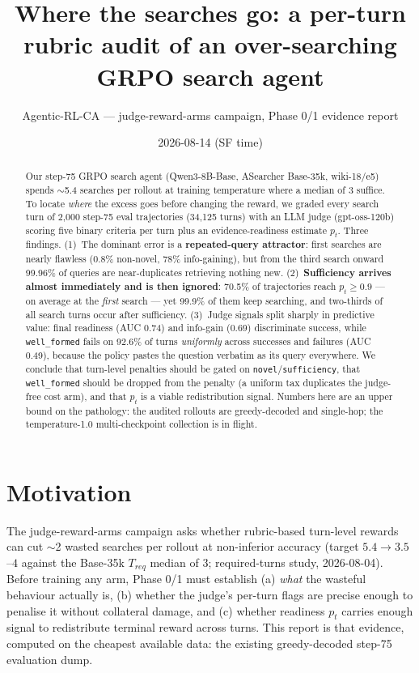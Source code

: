 \documentclass[10pt]{article}
\title{\vspace{-1.5em}Where the searches go: a per-turn rubric audit of an over-searching GRPO search agent\vspace{-0.4em}}
\author{Agentic-RL-CA --- judge-reward-arms campaign, Phase 0/1 evidence report}
\date{2026-08-14 (SF time)}
\newcommand{\code}[1]{\texttt{\small #1}}
\begin{document}
\maketitle\vspace{-1.9em}

\begin{abstract}
\noindent Our step-75 GRPO search agent (Qwen3-8B-Base, ASearcher Base-35k, wiki-18/e5) spends
$\sim$5.4 searches per rollout at training temperature where a median of 3 suffice. To locate
\emph{where} the excess goes before changing the reward, we graded every search turn of 2{,}000
step-75 eval trajectories (34{,}125 turns) with an LLM judge (gpt-oss-120b) scoring five binary
criteria per turn plus an evidence-readiness estimate $p_t$. Three findings. (1)~The dominant
error is a \textbf{repeated-query attractor}: first searches are nearly flawless (0.8\%
non-novel, 78\% info-gaining), but from the third search onward 99.96\% of queries are
near-duplicates retrieving nothing new. (2)~\textbf{Sufficiency arrives almost immediately and
is then ignored}: 70.5\% of trajectories reach $p_t \geq 0.9$ --- on average at the
\emph{first} search --- yet 99.9\% of them keep searching, and two-thirds of all search turns
occur after sufficiency. (3)~Judge signals split sharply in predictive value: final readiness
(AUC 0.74) and info-gain (0.69) discriminate success, while \code{well\_formed} fails on 92.6\%
of turns \emph{uniformly} across successes and failures (AUC 0.49), because the policy pastes
the question verbatim as its query everywhere. We conclude that turn-level penalties should be
gated on \code{novel}/\code{sufficiency}, that \code{well\_formed} should be dropped from the
penalty (a uniform tax duplicates the judge-free cost arm), and that $p_t$ is a viable
redistribution signal. Numbers here are an upper bound on the pathology: the audited rollouts
are greedy-decoded and single-hop; the temperature-1.0 multi-checkpoint collection is in flight.
\end{abstract}

\section{Motivation}
The judge-reward-arms campaign asks whether rubric-based turn-level rewards can cut
$\sim$2 wasted searches per rollout at non-inferior accuracy (target $5.4 \to 3.5$--$4$ against
the Base-35k $T_{req}$ median of 3; required-turns study, 2026-08-04). Before training any arm,
Phase 0/1 must establish (a) \emph{what} the wasteful behaviour actually is, (b) whether the
judge's per-turn flags are precise enough to penalise it without collateral damage, and (c)
whether readiness $p_t$ carries enough signal to redistribute terminal reward across turns.
This report is that evidence, computed on the cheapest available data: the existing
greedy-decoded step-75 evaluation dump.
\end{document}
